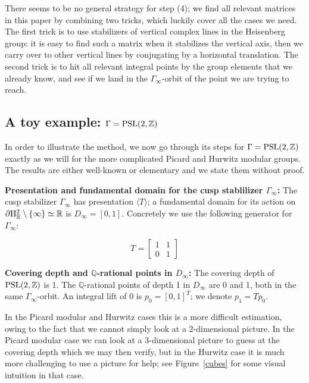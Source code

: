 \documentclass{article}[12pt]
\newcommand{\R}{\mathbb{R}}
\newcommand{\Z}{\mathbb{Z}}
\newcommand{\Q}{\mathbb{Q}}
\begin{document}
There seems to be no general strategy for step (4); we find all relevant matrices in this paper by combining two tricks, which luckily cover all the cases we need. The first trick is to use stabilizers of vertical complex lines in the Heisenberg group: it is easy to find such a matrix when it stabilizes the vertical axis, then we carry over to other vertical lines by conjugating by a horizontal translation. The second trick is to hit all relevant integral points by the group elements that we already know, and see if we land in the $\Gamma_\infty$-orbit of the point we are trying to reach. 






\subsection{A toy example: $\Gamma={\rm PSL(2,\Z)}$}\label{toyexample}

In order to illustrate the method, we now go through its steps for $\Gamma={\rm PSL(2,\Z)}$ exactly as we will for the more complicated Picard and Hurwitz modular groups. The results are either well-known or elementary and we state them without proof.

{\bf Presentation and fundamental domain for the cusp stablilizer $\Gamma_\infty$:} The cusp stabilizer $\Gamma_\infty$ has presentation $\langle T \rangle$; a fundamental domain for its action on $\partial {\rm H}^2_\R \setminus \{ \infty \} \simeq \R$ is $D_\infty=[0,1]$. Concretely we use the following generator for $\Gamma_\infty$:

$$T=\left[ \begin{array}{cc}
1 & 1 \\
0 & 1
\end{array}\right]
$$

{\bf Covering depth and $\Q$-rational points in $D_\infty$:} 
The covering depth of ${\rm PSL}(2,\Z)$ is 1. The $\Q$-rational points of depth 1 in $D_\infty$ are 0 and 1, both in the same $\Gamma_\infty$-orbit. An integral lift of 0 is $p_0=[0,1]^T$; we denote $p_1=Tp_0$.

In the Picard modular and Hurwitz cases this is a more difficult estimation, owing to the fact that we cannot simply look at a 2-dimensional picture.  In the Picard modular case we can look at a 3-dimensional picture to guess at the covering depth which we may then verify, but in the Hurwitz case it is much more challenging to  use a picture for help; see Figure~\ref{cubes} for some visual intuition in that case.  
\end{document}
